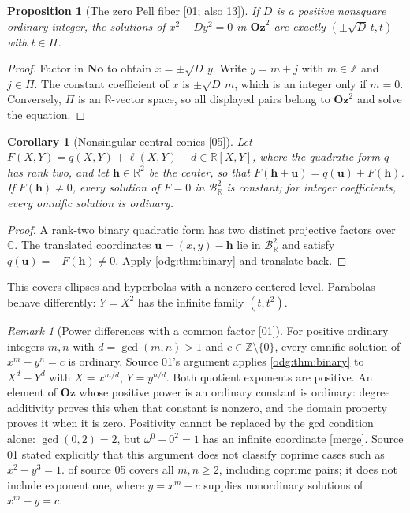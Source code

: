 \documentclass[11pt,oneside]{article}
\numberwithin{equation}{section}
\newtheorem{proposition}[proposition]{Proposition}
\newtheorem{corollary}[corollary]{Corollary}
\theoremstyle{definition}
\theoremstyle{remark}
\newtheorem{remark}[remark]{Remark}
\newcommand{\No}{\mathbf{No}}
\newcommand{\Oz}{\mathbf{Oz}}
\newcommand{\Z}{\mathbb Z}
\newcommand{\R}{\mathbb R}
\newcommand{\C}{\mathbb C}
\newcommand{\BR}{\mathcal B_{\R}}
\newcommand{\src}[1]{\textup{\textsf{\small[#1]}}}
\newcommand{\mergetag}{\textup{\textsf{\small[merge]}}}
\begin{document}
\begin{proposition}[The zero Pell fiber \src{01; also 13}]\label{odg:prop:zeropell}
If $D$ is a positive nonsquare ordinary integer, the solutions of
$x^2-Dy^2=0$ in $\Oz^2$ are exactly $(\pm\sqrt D\,t,t)$ with $t\in\Pi$.
\end{proposition}
\begin{proof}
Factor in $\No$ to obtain $x=\pm\sqrt D\,y$. Write $y=m+j$ with $m\in\Z$ and
$j\in\Pi$. The constant coefficient of $x$ is $\pm\sqrt D\,m$, which is an
integer only if $m=0$. Conversely, $\Pi$ is an $\R$-vector space, so all
displayed pairs belong to $\Oz^2$ and solve the equation.
\end{proof}

\begin{corollary}[Nonsingular central conics \src{05}]\label{odg:cor:conics}
Let $F(X,Y)=q(X,Y)+\ell(X,Y)+d\in\R[X,Y]$, where the quadratic form $q$ has
rank two, and let $\mathbf h\in\R^2$ be the center, so that
$F(\mathbf h+\mathbf u)=q(\mathbf u)+F(\mathbf h)$. If $F(\mathbf h)\ne0$,
every solution of $F=0$ in $\BR^2$ is constant; for integer coefficients,
every omnific solution is ordinary.
\end{corollary}
\begin{proof}
A rank-two binary quadratic form has two distinct projective factors over
$\C$. The translated coordinates $\mathbf u=(x,y)-\mathbf h$ lie in $\BR^2$
and satisfy $q(\mathbf u)=-F(\mathbf h)\ne0$. Apply \cref{odg:thm:binary}
and translate back.
\end{proof}

This covers ellipses and hyperbolas with a nonzero centered level.
Parabolas behave differently: $Y=X^2$ has the infinite family $(t,t^2)$.

\begin{remark}[Power differences with a common factor \src{01}]\label{odg:rem:powers}\label{odg:cor:powers}
For positive ordinary integers $m,n$ with $d=\gcd(m,n)>1$ and
$c\in\Z\setminus\{0\}$, every omnific solution of $x^m-y^n=c$ is ordinary.
Source 01's argument applies \cref{odg:thm:binary} to $X^d-Y^d$ with
$X=x^{m/d}$, $Y=y^{n/d}$. Both quotient exponents are positive. An element
of $\Oz$ whose positive power is an ordinary constant is ordinary: degree
additivity proves this when that constant is nonzero, and the domain
property proves it when it is zero. Positivity cannot be replaced by the
gcd condition alone: $\gcd(0,2)=2$, but $\omega^0-0^2=1$ has an infinite
coordinate \mergetag.
Source 01 stated explicitly that this argument does not classify coprime
cases such as $x^2-y^3=1$.  of source 05 covers
all $m,n\ge2$, including coprime pairs; it does not include exponent one,
where $y=x^m-c$ supplies nonordinary solutions of $x^m-y=c$.
\end{remark}
\end{document}
